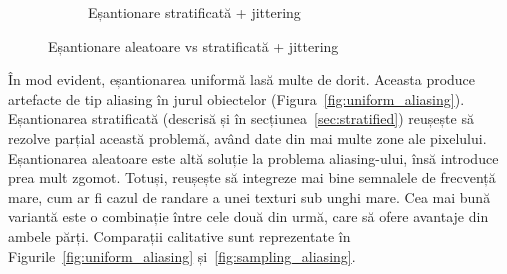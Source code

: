 \documentclass[12pt,a4paper]{report}
\numberwithin{equation}{section} %
\begin{document}
\begin{figure}[ht]
\begin{subfigure}[h]{0.45\linewidth}
		\caption{Eșantionare stratificată + jittering}
	\end{subfigure}
	\caption{Eșantionare aleatoare vs stratificată + jittering\protect{}}
	\label{fig:random_sampling}
\end{figure}

În mod evident, eșantionarea uniformă lasă multe de dorit. Aceasta produce artefacte
de tip aliasing în jurul obiectelor (Figura~\ref{fig:uniform_aliasing}). Eșantionarea
stratificată (descrisă și în secțiunea~\ref{sec:stratified}) reușește să rezolve parțial
această problemă, având date din mai multe zone ale pixelului. Eșantionarea aleatoare
este altă soluție la problema aliasing-ului, însă introduce prea mult zgomot. Totuși,
reușește să integreze mai bine semnalele de frecvență mare, cum ar fi cazul de randare
a unei texturi sub unghi mare.
Cea mai bună variantă este o combinație între cele două din urmă, care să ofere
avantaje din ambele părți. Comparații calitative sunt reprezentate în Figurile~\ref{fig:uniform_aliasing} și~\ref{fig:sampling_aliasing}.
\end{document}
